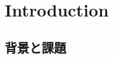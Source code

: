 \documentclass{article}
\begin{document}
\section{Introduction}
\subsection{背景と課題 }





\end{document}
